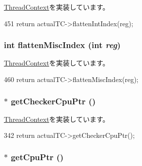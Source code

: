 \hyperlink{classThreadContext_a6940c379416884cb0b9eb04c5193580e}{ThreadContext}を実装しています。


\begin{DoxyCode}
451     { return actualTC->flattenIntIndex(reg); }
\end{DoxyCode}
\hypertarget{classProxyThreadContext_a5adc7d32f3a8bd75c5dc0a62d95564fd}{
\subsubsection[{flattenMiscIndex}]{\setlength{\rightskip}{0pt plus 5cm}int flattenMiscIndex (int {\em reg})}}
\label{classProxyThreadContext_a5adc7d32f3a8bd75c5dc0a62d95564fd}


\hyperlink{classThreadContext_a8014f007a20a06d35f8b13adc3a05816}{ThreadContext}を実装しています。


\begin{DoxyCode}
460     { return actualTC->flattenMiscIndex(reg); }
\end{DoxyCode}
\hypertarget{classProxyThreadContext_a0807ebbe39e158fdf6007ca00e3f7252}{
\subsubsection[{getCheckerCpuPtr}]{$\ast$ getCheckerCpuPtr ()}}
\label{classProxyThreadContext_a0807ebbe39e158fdf6007ca00e3f7252}


\hyperlink{classThreadContext_a78c10882b34a6238eac936f6913f9918}{ThreadContext}を実装しています。


\begin{DoxyCode}
342 { return actualTC->getCheckerCpuPtr(); }
\end{DoxyCode}
\hypertarget{classProxyThreadContext_a4f35ce7d5cb2ec57504bc2c2bc03c879}{
\subsubsection[{getCpuPtr}]{$\ast$ getCpuPtr ()}}
\label{classProxyThreadContext_a4f35ce7d5cb2ec57504bc2c2bc03c879}


